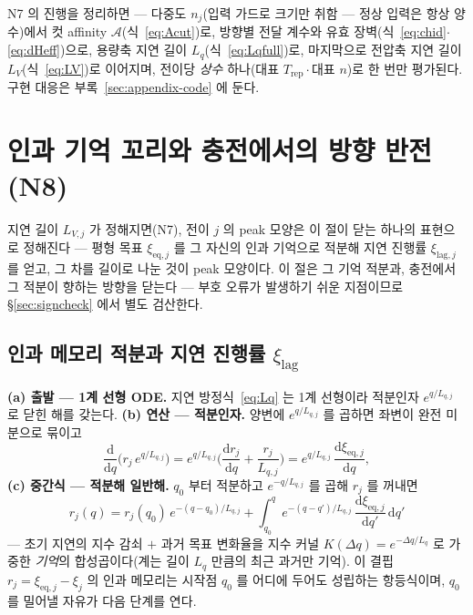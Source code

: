 \documentclass[11pt,a4paper]{article}
\newcommand{\dd}{\mathrm{d}}
\newcommand{\eq}{\mathrm{eq}}
\newcommand{\rep}{\mathrm{rep}}
\begin{document}
N7 의 진행을 정리하면 — 다중도 $n_j$(입력 가드로 크기만 취함 — 정상 입력은 항상 양수)에서 컷 affinity $\mathcal A$(식~\eqref{eq:Acut})로,
방향별 전달 계수와 유효 장벽(식~\eqref{eq:chid}$\cdot$\eqref{eq:dHeff})으로, 용량축 지연 길이
$L_q$(식~\eqref{eq:Lqfull})로, 마지막으로 전압축 지연 길이 $L_V$(식~\eqref{eq:LV})로 이어지며, 전이당
\emph{상수} 하나(대표 $T_\rep\cdot$대표 $n$)로 한 번만 평가된다. 구현 대응은
부록~\ref{sec:appendix-code} 에 둔다.

\section{인과 기억 꼬리와 충전에서의 방향 반전 (N8)}\label{sec:tail}
지연 길이 $L_{V,j}$ 가 정해지면(N7), 전이 $j$ 의 peak 모양은 이 절이 닫는 하나의 표현으로 정해진다 ---
평형 목표 $\xi_{\eq,j}$ 를 그 자신의 인과 기억으로 적분해 지연 진행률 $\xi_{\mathrm{lag},j}$ 를 얻고, 그
차를 길이로 나눈 것이 peak 모양이다. 이 절은 그 기억 적분과, 충전에서 그 적분이 향하는 방향을 닫는다 ---
부호 오류가 발생하기 쉬운 지점이므로 \S\ref{sec:signcheck} 에서 별도 검산한다.

\subsection{인과 메모리 적분과 지연 진행률 $\xi_\mathrm{lag}$}
\textbf{(a) 출발 --- 1계 선형 ODE.} 지연 방정식~\eqref{eq:Lq} 는 1계 선형이라 적분인자 $e^{q/L_{q,j}}$ 로
닫힌 해를 갖는다. \textbf{(b) 연산 --- 적분인자.} 양변에 $e^{q/L_{q,j}}$ 를 곱하면 좌변이 완전 미분으로
묶이고
\begin{equation}
\frac{\dd}{\dd q}\Big(r_j\,e^{q/L_{q,j}}\Big)
=e^{q/L_{q,j}}\Big(\frac{\dd r_j}{\dd q}+\frac{r_j}{L_{q,j}}\Big)
=e^{q/L_{q,j}}\,\frac{\dd\xi_{\eq,j}}{\dd q},
\label{eq:intfactor}
\end{equation}
\textbf{(c) 중간식 --- 적분해 일반해.} $q_0$ 부터 적분하고 $e^{-q/L_{q,j}}$ 를 곱해 $r_j$ 를 꺼내면
\begin{equation}
r_j(q)=r_j(q_0)\,e^{-(q-q_0)/L_{q,j}}
+\int_{q_0}^{q}e^{-(q-q')/L_{q,j}}\,\frac{\dd\xi_{\eq,j}}{\dd q'}\,\dd q'
\label{eq:memory}
\end{equation}
--- 초기 지연의 지수 감쇠 $+$ 과거 목표 변화율을 지수 커널 $K(\Delta q)=e^{-\Delta q/L_q}$ 로 가중한
\emph{기억}의 합성곱이다(계는 길이 $L_q$ 만큼의 최근 과거만 기억). 이 결핍 $r_j=\xi_{\eq,j}-\xi_j$
의 인과 메모리는 시작점 $q_0$ 를 어디에 두어도 성립하는 항등식이며, $q_0$ 를 밀어낼 자유가 다음
단계를 연다.
\end{document}
